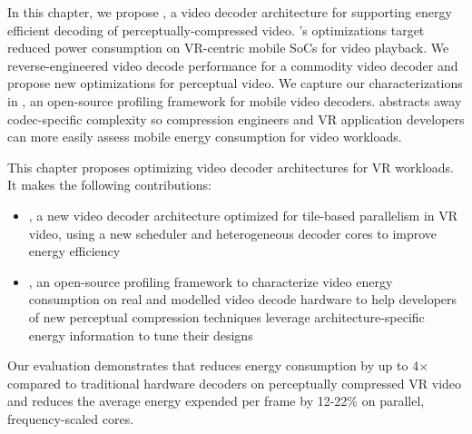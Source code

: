 In this chapter, we propose \nameArch, a video decoder architecture for supporting energy efficient decoding of perceptually-compressed video.
\nameArch's optimizations target reduced power consumption on VR-centric mobile SoCs for video playback.
We reverse-engineered video decode performance for a commodity video decoder and propose new optimizations for perceptual video.
We capture our characterizations in \nameArchprof, an open-source profiling framework for mobile video decoders.
\nameArchprof abstracts away codec-specific complexity so compression engineers and VR application developers can more easily assess mobile energy consumption for video workloads.

This chapter proposes optimizing video decoder architectures for VR workloads.
It makes the following contributions:
\begin{itemize}
    \item \nameArch, a new video decoder architecture optimized for tile-based parallelism in VR video, using a new scheduler and heterogeneous decoder cores to improve energy efficiency
    \item \nameArchprof, an open-source profiling framework to characterize video energy consumption on real and modelled video decode hardware to help developers of new perceptual compression techniques leverage architecture-specific energy information to tune their designs
\end{itemize}

Our evaluation demonstrates that \nameArch reduces energy consumption by up to 4$\times$ compared to traditional hardware decoders on perceptually compressed VR video and reduces the average energy expended per frame by 12-22\% on parallel, frequency-scaled cores.
